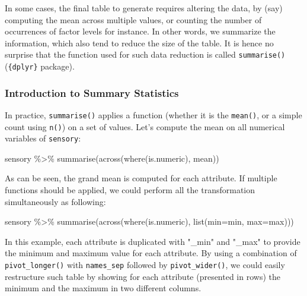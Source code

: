 \documentclass[
]{book}
\newenvironment{Shaded}{\begin{snugshade}}{\end{snugshade}}
\newcommand{\AttributeTok}[1]{\textcolor[rgb]{0.77,0.63,0.00}{#1}}
\newcommand{\FunctionTok}[1]{\textcolor[rgb]{0.00,0.00,0.00}{#1}}
\newcommand{\NormalTok}[1]{#1}
\newcommand{\SpecialCharTok}[1]{\textcolor[rgb]{0.00,0.00,0.00}{#1}}
\begin{document}
In some cases, the final table to generate requires altering the data, by (say) computing the mean across multiple values, or counting the number of occurrences of factor levels for instance. In other words, we summarize the information, which also tend to reduce the size of the table. It is hence no surprise that the function used for such data reduction is called \texttt{summarise()} (\texttt{\{dplyr\}} package).

\hypertarget{introduction-to-summary-statistics}{%
\subsubsection{Introduction to Summary Statistics}\label{introduction-to-summary-statistics}}

In practice, \texttt{summarise()} applies a function (whether it is the \texttt{mean()}, or a simple count using \texttt{n()}) on a set of values. Let's compute the mean on all numerical variables of \texttt{sensory}:

\begin{Shaded}
\begin{Highlighting}[]
\NormalTok{sensory }\SpecialCharTok{\%\textgreater{}\%} 
  \FunctionTok{summarise}\NormalTok{(}\FunctionTok{across}\NormalTok{(}\FunctionTok{where}\NormalTok{(is.numeric), mean))}
\end{Highlighting}
\end{Shaded}

As can be seen, the grand mean is computed for each attribute.
If multiple functions should be applied, we could perform all the transformation simultaneously as following:

\begin{Shaded}
\begin{Highlighting}[]
\NormalTok{sensory }\SpecialCharTok{\%\textgreater{}\%} 
  \FunctionTok{summarise}\NormalTok{(}\FunctionTok{across}\NormalTok{(}\FunctionTok{where}\NormalTok{(is.numeric), }\FunctionTok{list}\NormalTok{(}\AttributeTok{min=}\NormalTok{min, }\AttributeTok{max=}\NormalTok{max)))}
\end{Highlighting}
\end{Shaded}

In this example, each attribute is duplicated with "\_min" and "\_max" to provide the minimum and maximum value for each attribute. By using a combination of \texttt{pivot\_longer()} with \texttt{names\_sep} followed by \texttt{pivot\_wider()}, we could easily restructure such table by showing for each attribute (presented in rows) the minimum and the maximum in two different columns.
\end{document}
